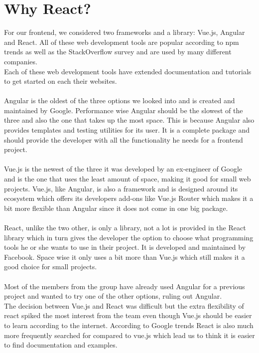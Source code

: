 \section{Why React?}
For our frontend, we considered two frameworks and a library: Vue.js, Angular and React.
All of these web development tools are popular according to npm trends as well as the StackOverflow survey and are used by many different companies\cite{VueReactAngular}.
\\
Each of these web development tools have extended documentation and tutorials to get started on each their websites.
\\\\
Angular is the oldest of the three options we looked into and is created and maintained by Google\cite{AngularHistory}.
Performance wise Angular should be the slowest of the three and also the one that takes up the most space\cite{VueReactAngular}.
This is because Angular also provides templates and testing utilities for its user.
It is a complete package and should provide the developer with all the functionality he needs for a frontend project.
\\\\
Vue.js is the newest of the three it was developed by an ex-engineer of Google and is the one that uses the least amount of space, making it good for small web projects\cite{ComparisonWithOtherFrameworks}.
Vue.js, like Angular, is also a framework and is designed around its ecosystem which offers its developers add-ons like Vue.js Router which makes it a bit more flexible than Angular since it does not come in one big package.
\\\\
React, unlike the two other, is only a library\cite{ReactJS}, not a lot is provided in the React library which in turn gives the developer the option to choose what programming tools he or she wants to use in their project.
It is developed and maintained by Facebook\cite{ReactHistory}.
Space wise it only uses a bit more than Vue.js which still makes it a good choice for small projects.
\\\\
Most of the members from the group have already used Angular for a previous project and wanted to try one of the other options, ruling out Angular. 
\\
The decision between Vue.js and React was difficult but the extra flexibility of react spiked the most interest from the team even though Vue.js should be easier to learn according to the internet\cite{ComparisonWithOtherFrameworks}.
According to Google trends React is also much more frequently searched for compared to vue.js which lead us to think it is easier to find documentation and examples.

